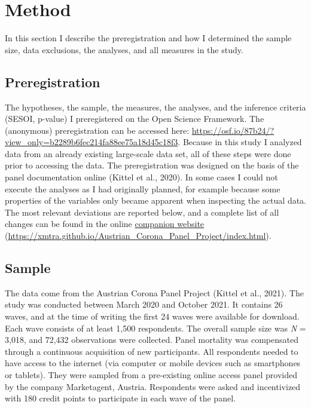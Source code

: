 \documentclass[
  english,
  man,mask,floatsintext]{apa6}
\begin{document}
\hypertarget{method}{%
\section{Method}\label{method}}

In this section I describe the preregistration and how I determined the sample size, data exclusions, the analyses, and all measures in the study.

\hypertarget{preregistration}{%
\subsection{Preregistration}\label{preregistration}}

The hypotheses, the sample, the measures, the analyses, and the inference criteria (SESOI, p-value) I preregistered on the Open Science Framework.
The (anonymous) preregistration can be accessed here: \url{https://osf.io/87b24/?view_only=b2289b6fec214fa88ee75a18d45c18f3}.
Because in this study I analyzed data from an already existing large-scale data set, all of these steps were done prior to accessing the data.
The preregistration was designed on the basis of the panel documentation online (Kittel et al., 2020).
In some cases I could not execute the analyses as I had originally planned, for example because some properties of the variables only became apparent when inspecting the actual data.
The most relevant deviations are reported below, and a complete list of all changes can be found in the online \href{https://xmtra.github.io/Austrian_Corona_Panel_Project/index.html}{companion website} (\url{https://xmtra.github.io/Austrian_Corona_Panel_Project/index.html}).

\hypertarget{sample}{%
\subsection{Sample}\label{sample}}

The data come from the Austrian Corona Panel Project (Kittel et al., 2021).
The study was conducted between March 2020 and October 2021.
It contains 26 waves, and at the time of writing the first 24 waves were available for download.
Each wave consists of at least 1,500 respondents.
The overall sample size was \emph{N} = 3,018, and 72,432 observations were collected.
Panel mortality was compensated through a continuous acquisition of new participants.
All respondents needed to have access to the internet (via computer or mobile devices such as smartphones or tablets).
They were sampled from a pre-existing online access panel provided by the company Marketagent, Austria.
Respondents were asked and incentivized with 180 credit points to participate in each wave of the panel.
\end{document}
